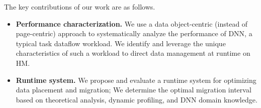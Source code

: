 The key contributions of our work are as follows.
\begin{itemize}
    \item \textbf{Performance characterization.} We use a data object-centric (instead of page-centric) approach to systematically analyze the performance of DNN, a typical task dataflow workload. We identify and leverage the unique characteristics of such a workload to direct data management at runtime on HM. 
    
    


\item \textbf{Runtime system.} We propose and evaluate a runtime system for optimizing data placement and migration; We determine the optimal migration interval based on theoretical analysis, dynamic profiling, and DNN domain knowledge. %




\end{itemize}
